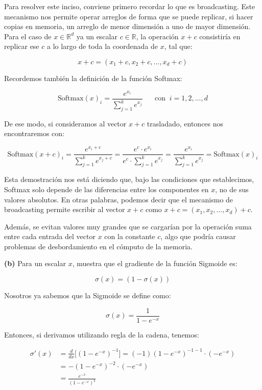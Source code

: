 Para resolver este inciso, conviene primero recordar lo que es broadcasting. Este mecanismo
nos permite operar arreglos de forma que se puede replicar, si hacer copias en memoria, un 
arreglo de menor dimensión a uno de mayor dimensión. Para el caso de $x \in \mathbb{R}^d$ ya
un escalar $c \in \mathbb{R}$, la operación $x+c$ consistiría en replicar ese $c$ a lo largo 
de toda la coordenada de $x$, tal que:

\[
    x+c = (x_1 + c, x_2 + c,..., x_d + c)
\]  

Recordemos también la definición de la función Softmax:

\[
    \text{Softmax}(x)_i = \frac{e^{x_i}}{\sum_{j=1}^{k} e^{x_j}} \;\;\;\;\;\; \text{con} \;\; i = 1,2,...,d 
\]

De ese modo, si consideramos al vector $x+c$ trasladado, entonces nos encontraremos con:

\[
    \boxed{\text{Softmax}(x+c)_i = \frac{e^{x_i + c}}{\sum_{j=1}^{k} e^{x_j + c}} = \frac{e^c \cdot e^{x_i}}{e^c \cdot \sum_{j=1}^{k} e^{x_j}} = \frac{e^{x_i}}{\sum_{j=1}^{k} e^{x_j}}  = \text{Softmax}(x)_i}
\]

Esta demostración nos está diciendo que, bajo las condiciones que establecimos, Softmax
solo depende de las diferencias entre los componentes en $x$, no de sus valores absolutos.
En otras palabras, podemos decir que el mecanismo de broadcasting permite escribir al vector
$x+c$ como $x+c = (x_1, x_2,...,x_d)+c$. 

Además, se evitan valores muy grandes que se cargarían por la operación suma entre cada entrada 
del vector $x$ con la constante $c$, algo que podría causar problemas de desbordamiento en el 
cómputo de la memoria. 

\begin{myblock}
    \textbf{(b)} Para un escalar $x$, muestra que el gradiente de la función Sigmoide es: 

    \[
        \sigma(x) = (1 - \sigma(x))
    \]
\end{myblock}

Nosotros ya sabemos que la Sigmoide se define como:

\[
    \sigma(x) = \frac{1}{1 - e^{-x}}
\]

Entonces, si derivamos utilizando regla de la cadena, tenemos:

\begin{align*}
        \sigma'(x) &= \frac{d}{dx} \big[(1 - e^{-x})^{-1}\big] = (-1) (1 - e^{-x})^{-1-1} \cdot (-e^{-x})\\
                   &= -(1 - e^{-x})^{-2} \cdot (-e^{-x}) \\
                   &= \frac{e^{-x}}{(1-e^{-x})^2} 
\end{align*}

